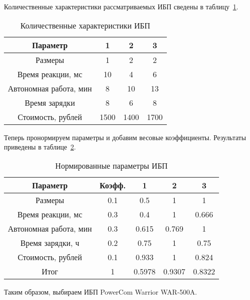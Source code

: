 Количественные характеристики рассматриваемых ИБП сведены в таблицу~\ref{table:ibp_compare_numb}.

\begin{table}[h]
\caption{Количественные характеристики ИБП}
\label{table:ibp_compare_numb}
\centering
  \begin{tabular}{|c|c|c|c|}
  \hline Параметр & 1 & 2 & 3 \\
  \hline Размеры & 1 & 2 & 2 \\
  \hline Время реакции, мс & 10 & 4 & 6 \\
  \hline Автономная работа, мин & 8 & 10 & 13 \\
  \hline Время зарядки & 8 & 6 & 8 \\
  \hline Стоимость, рублей & 1500 & 1400 & 1700 \\
  \hline
  \end{tabular}
\end{table}

\newpage

Теперь пронормируем параметры и добавим весовые коэффициенты. Результаты приведены в таблице~\ref{table:ibp_compare}.

\begin{table}[h]
\caption{Нормированные параметры ИБП}
\label{table:ibp_compare}
\centering
  \begin{tabular}{|c|c|c|c|c|}
  \hline Параметр               & Коэфф. & 1      & 2      & 3 \\
  \hline Размеры                & 0.1    & 0.5    & 1      & 1 \\
  \hline Время реакции, мс      & 0.3    & 0.4    & 1      & 0.666 \\
  \hline Автономная работа, мин & 0.3    & 0.615  & 0.769  & 1 \\
  \hline Время зарядки, ч       & 0.2    & 0.75   & 1      & 0.75 \\
  \hline Стоимость, рублей      & 0.1    & 0.933  & 1      & 0.824 \\
  \hline Итог                   & 1      & 0.5978 & 0.9307 & 0.8322 \\
  \hline
  \end{tabular}
\end{table}

Таким образом, выбираем ИБП PowerCom Warrior WAR-500A.